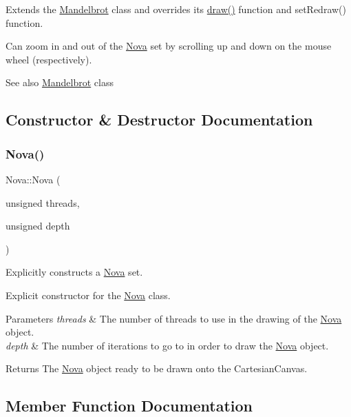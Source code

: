 Extends the \hyperlink{class_mandelbrot}{Mandelbrot} class and overrides its \hyperlink{class_nova_a66935ba0814dfabcae2481c128c336ec}{draw()} function and set\+Redraw() function.

Can zoom in and out of the \hyperlink{class_nova}{Nova} set by scrolling up and down on the mouse wheel (respectively). \begin{DoxySeeAlso}{See also}
\hyperlink{class_mandelbrot}{Mandelbrot} class 
\end{DoxySeeAlso}


\subsection{Constructor \& Destructor Documentation}
\mbox{\label{class_nova_a9d171954a6dd98b125587be83ef04db5}} 
\subsubsection{\texorpdfstring{Nova()}{Nova()}}
{\footnotesize\ttfamily Nova\+::\+Nova (\begin{DoxyParamCaption}\item[{unsigned}]{threads,  }\item[{unsigned}]{depth }\end{DoxyParamCaption})}



Explicitly constructs a \hyperlink{class_nova}{Nova} set. 

Explicit constructor for the \hyperlink{class_nova}{Nova} class. 
\begin{DoxyParams}{Parameters}
{\em threads} & The number of threads to use in the drawing of the \hyperlink{class_nova}{Nova} object. \\
\hline
{\em depth} & The number of iterations to go to in order to draw the \hyperlink{class_nova}{Nova} object. \\
\hline
\end{DoxyParams}
\begin{DoxyReturn}{Returns}
The \hyperlink{class_nova}{Nova} object ready to be drawn onto the Cartesian\+Canvas. 
\end{DoxyReturn}


\subsection{Member Function Documentation}
\mbox{\label{class_nova_a66935ba0814dfabcae2481c128c336ec}} 
